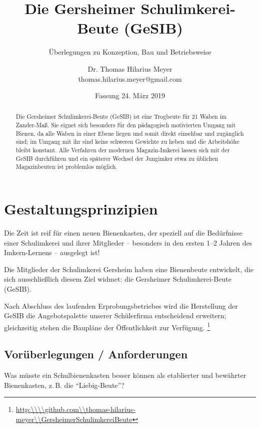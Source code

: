 \documentclass[12pt,a4paper,ngerman]{scrartcl}
\author{Dr. Thomas Hilarius Meyer\\ \textsf{thomas.hilarius.meyer@gmail.com}}
\title{Die Gersheimer Schulimkerei-Beute (GeSIB)}
\subtitle{Überlegungen zu Konzeption, Bau und Betriebsweise}
\date{Fassung 24. März 2019}
\begin{document}
\maketitle


\begin{abstract}
  Die Gersheimer Schulimkerei-Beute (GeSIB) ist eine Trogbeute für 21 Waben im Zander-Maß.
  Sie eignet sich besonders für den pädagogisch motivierten Umgang mit Bienen, da alle Waben in einer
  Ebene liegen und somit direkt einsehbar und zugänglich sind; im Umgang mit ihr sind
  keine schweren Gewichte zu heben und die Arbeitshöhe bleibt konstant.
  Alle Verfahren der modernen Magazin-Imkerei lassen sich mit der GeSIB durchführen und
  ein späterer Wechsel der Jungimker etwa zu üblichen Magazinbeuten ist problemlos möglich.
\end{abstract}


\section{Gestaltungsprinzipien}

Die Zeit ist reif für einen neuen Bienenkasten,
der speziell auf die Bedürfnisse einer Schulimkerei und ihrer Mitglieder --
besonders in den ersten 1--2 Jahren des Imkern-Lernens -- ausgelegt ist!

Die Mitglieder der Schulimkerei Gersheim haben eine Bienenbeute entwickelt,
die sich ausschließlich diesem Ziel widmet:
die Gersheimer Schulimkerei-Beute (GeSIB).

Nach Abschluss des laufenden Erprobungsbetriebes wird die Herstellung der GeSIB die Angebotspalette unserer
Schülerfirma entscheidend erweitern;
gleichzeitig stehen die Baupläne der Öffentlichkeit zur Verfügung.%
\footnote{\url{http:\\\\github.com\\thomas-hilarius-meyer\\GersheimerSchulimkereiBeute}}


\subsection{Vorüberlegungen / Anforderungen}

Was müsste ein Schulbienenkasten besser können als etablierter und bewährter Bienenkasten,
z.\,B. die \enquote{Liebig-Beute}?
\end{document}
